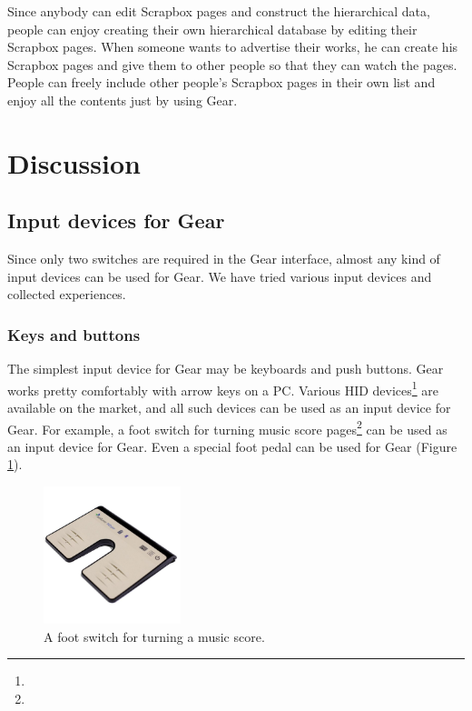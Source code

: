 \documentclass[conference]{IEEEtran}
\def\SB{Scrapbox}
\begin{document}
Since anybody can edit {\SB} pages and construct the hierarchical data,
people can enjoy creating their own hierarchical database by editing their {\SB} pages.
When someone wants to advertise their works,
he can create his {\SB} pages
and give them to other people so that they can watch the pages.
People can freely include other people's {\SB} pages in their own list
and enjoy all the contents just by using Gear.

\section{Discussion}

\subsection{Input devices for Gear}

Since only two switches are required in the Gear interface,
almost any kind of input devices can be used for Gear.
We have tried various input devices and collected experiences.

\subsubsection{Keys and buttons}

The simplest input device for Gear may be keyboards and push buttons.
Gear works pretty comfortably with arrow keys on a PC.
Various HID devices\footnote{
} are available on the market, and
all such devices can be used as an input device for Gear.
For example, a foot switch for turning music score pages\footnote{
} can be used as an input device for Gear.
Even a special foot pedal can be used for Gear (Figure \ref{footswitch}).

\begin{figure}[H]
\centerline{\includegraphics[width=40mm,bb=0 0 900 900]{figures/8d4f811f5a0c393acaff304102ba963f.jpg}}
\caption{A foot switch for turning a music score.}
\label{footswitch}
\end{figure}
\end{document}
